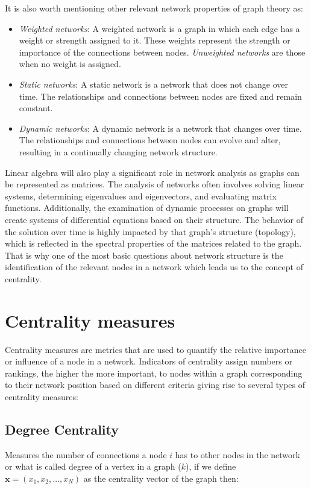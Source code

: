 It is also worth mentioning other relevant network properties of graph theory as:

\begin{itemize}
  \item \textit{Weighted networks}: A weighted network is a graph in which each edge has a weight or strength assigned to it. These weights represent the strength or importance of the connections between nodes. \textit{Unweighted networks} are those when no weight is assigned.
  \item \textit{Static networks}: A static network is a network that does not change over time. The relationships and connections between nodes are fixed and remain constant. 
  \item \textit{Dynamic networks}: A dynamic network is a network that changes over time. The relationships and connections between nodes can evolve and alter, resulting in a continually changing network structure.
\end{itemize}

Linear algebra will also play a significant role in network analysis as graphs can be represented as matrices. The analysis of networks often involves solving linear systems, determining eigenvalues and eigenvectors, and evaluating matrix functions. Additionally, the examination of dynamic processes on graphs will create systems of differential equations based on their structure. The behavior of the solution over time is highly impacted by that graph's structure (topology), which is reflected in the spectral properties of the matrices related to the graph. That is why one of the most basic questions about network structure is the identification of the relevant nodes in a network which leads us to the concept of centrality.

\section{Centrality measures}
\label{sec:centra}
 Centrality measures are metrics that are used to quantify the relative importance or influence of a node in a network. Indicators of centrality assign numbers or rankings, the higher the more important, to nodes within a graph corresponding to their network position based on different criteria giving rise to several types of centrality measures:

\subsection*{Degree Centrality} Measures the number of connections a node $i$ has to other nodes in the network or what is called degree of a vertex in a graph ($k$), if we define $\mathbf{x}=(x_1,x_2,\dots,x_N)$ as the centrality vector of the graph then: 

